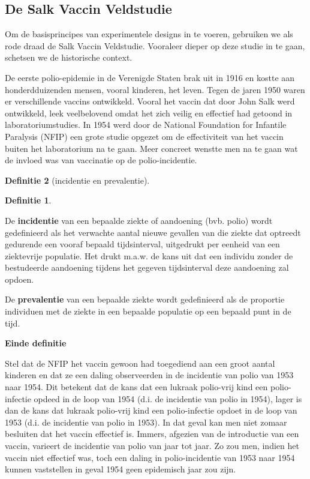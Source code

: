\documentclass[
  12pt,dutch,coursenotes]{book}
\theoremstyle{definition}
\newtheorem{definition}{Definitie}[chapter]
\theoremstyle{definition}
\theoremstyle{definition}
\theoremstyle{remark}
\begin{document}
\hypertarget{de-salk-vaccin-veldstudie}{%
\subsection{De Salk Vaccin Veldstudie}\label{de-salk-vaccin-veldstudie}}

Om de basisprincipes van experimentele designs in te voeren, gebruiken we als rode draad de Salk Vaccin Veldstudie. Vooraleer dieper op deze studie in te gaan, schetsen we de historische context.

De eerste polio-epidemie in de Verenigde Staten brak uit in 1916 en kostte
aan honderdduizenden mensen, vooral kinderen, het leven. Tegen de jaren 1950
waren er verschillende vaccins ontwikkeld. Vooral het vaccin dat door John
Salk werd ontwikkeld, leek veelbelovend omdat het zich veilig en effectief
had getoond in laboratoriumstudies. In 1954 werd door de National Foundation
for Infantile Paralysis (NFIP) een grote studie opgezet om de effectiviteit
van het vaccin buiten het laboratorium na te gaan. Meer concreet wenstte men
na te gaan wat de invloed was van vaccinatie op de polio-incidentie.

\begin{definition}[incidentie en prevalentie]
\begin{definition}

\protect\hypertarget{def:unnamed-chunk-65}{}{\label{def:unnamed-chunk-65} \iffalse (incidentie en prevalentie) \fi{} }

\end{definition}
\end{definition}

De \textbf{incidentie} van een bepaalde ziekte of aandoening (bvb. polio)
wordt gedefinieerd als het verwachte aantal nieuwe gevallen van die ziekte
dat optreedt gedurende een vooraf bepaald tijdsinterval, uitgedrukt per
eenheid van een ziektevrije populatie. Het drukt m.a.w. de kans uit dat een
individu zonder de bestudeerde aandoening tijdens het gegeven tijdsinterval
deze aandoening zal opdoen.

De \textbf{prevalentie} van een bepaalde ziekte wordt gedefinieerd als de
proportie individuen met de ziekte in een bepaalde populatie op een bepaald
punt in de tijd.

\textbf{Einde definitie}

Stel dat de NFIP het vaccin gewoon had toegediend aan een groot aantal
kinderen en dat ze een daling observeerden in de incidentie van polio van
1953 naar 1954. Dit betekent dat de kans dat een lukraak polio-vrij kind een
polio-infectie opdeed in de loop van 1954 (d.i. de incidentie van polio in
1954), lager is dan de kans dat lukraak polio-vrij kind een polio-infectie
opdoet in de loop van 1953 (d.i. de incidentie van polio in 1953). In dat
geval kan men niet zomaar besluiten dat het vaccin effectief is. Immers,
afgezien van de introductie van een vaccin, varieert de incidentie van polio
van jaar tot jaar. Zo zou men, indien het vaccin niet effectief was, toch
een daling in polio-incidentie van 1953 naar 1954 kunnen vaststellen in
geval 1954 geen epidemisch jaar zou zijn.
\end{document}
